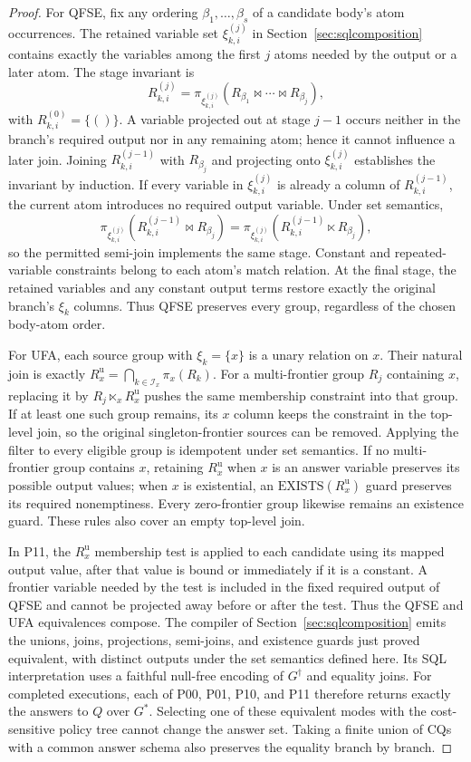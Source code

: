 \documentclass[conference]{IEEEtran}
\theoremstyle{definition}
\newcommand{\Gc}{G^{\dagger}}
\newcommand{\QFSE}{\textsc{QFSE}}
\newcommand{\UFA}{\textsc{UFA}}
\begin{document}
\begin{proof}
For \QFSE{}, fix any ordering $\beta_1,\ldots,\beta_s$ of a
candidate body's atom occurrences. The retained variable set
$\xi_{k,i}^{(j)}$ in Section~\ref{sec:sqlcomposition} contains exactly the variables
among the first $j$ atoms needed by the output or a later atom.
The stage invariant is
\[
R_{k,i}^{(j)}
=\pi_{\xi_{k,i}^{(j)}}
 (R_{\beta_1}\bowtie\cdots\bowtie R_{\beta_j}),
\]
with
$R_{k,i}^{(0)}=\{()\}$. A variable projected out at stage $j-1$
occurs neither in the branch's required output nor in any
remaining atom; hence it cannot influence a later join.
Joining $R_{k,i}^{(j-1)}$ with $R_{\beta_j}$ and projecting onto
$\xi_{k,i}^{(j)}$
establishes the invariant by induction. If every variable in
$\xi_{k,i}^{(j)}$ is already a column of $R_{k,i}^{(j-1)}$, the current atom
introduces no required output variable. Under set semantics,
\[
\pi_{\xi_{k,i}^{(j)}}(R_{k,i}^{(j-1)}\bowtie R_{\beta_j})
=\pi_{\xi_{k,i}^{(j)}}(R_{k,i}^{(j-1)}\ltimes R_{\beta_j}),
\]
so the permitted semi-join implements the same stage. Constant
and repeated-variable constraints belong to each atom's match
relation. At the final stage, the retained variables and any
constant output terms restore exactly the original branch's
$\xi_k$ columns. Thus \QFSE{} preserves every group, regardless of
the chosen body-atom order.

For \UFA{}, each source group with $\xi_k=\{x\}$ is a unary relation
on $x$. Their natural join is exactly
$R_x^{\mathrm u}=\bigcap_{k\in \mathcal I_x}\pi_x(R_k)$.
For a multi-frontier group $R_j$ containing $x$, replacing it by
$R_j\ltimes_x R_x^{\mathrm u}$ pushes the same membership constraint into
that group. If at least one such group remains, its $x$ column
keeps the constraint in the top-level join, so the original
singleton-frontier sources can be removed. Applying the filter
to every eligible group is idempotent under set semantics.
If no multi-frontier group contains $x$, retaining $R_x^{\mathrm u}$ when
$x$ is an answer variable preserves its possible output values;
when $x$ is existential, an $\mathrm{EXISTS}(R_x^{\mathrm u})$ guard
preserves its required nonemptiness. Every zero-frontier group
likewise remains an existence guard. These rules also cover an
empty top-level join.

In P11, the $R_x^{\mathrm u}$ membership test is applied to each candidate
using its mapped output value, after that value is bound or
immediately if it is a constant. A frontier variable needed by
the test is included in the fixed required output of \QFSE{} and
cannot be projected away before or after the test. Thus the
\QFSE{} and \UFA{} equivalences compose.
The compiler of Section~\ref{sec:sqlcomposition} emits the unions, joins, projections,
semi-joins, and existence guards just proved equivalent, with
distinct outputs under the set semantics defined here. Its SQL
interpretation uses a faithful null-free encoding of $\Gc$ and
equality joins. For completed executions, each of P00, P01, P10,
and P11 therefore returns exactly the answers to $Q$ over $G^{*}$.
Selecting one of these equivalent modes with the cost-sensitive
policy tree cannot change the answer set. Taking a finite union
of CQs with a common answer schema also preserves the equality
branch by branch.
\end{proof}
\end{document}
